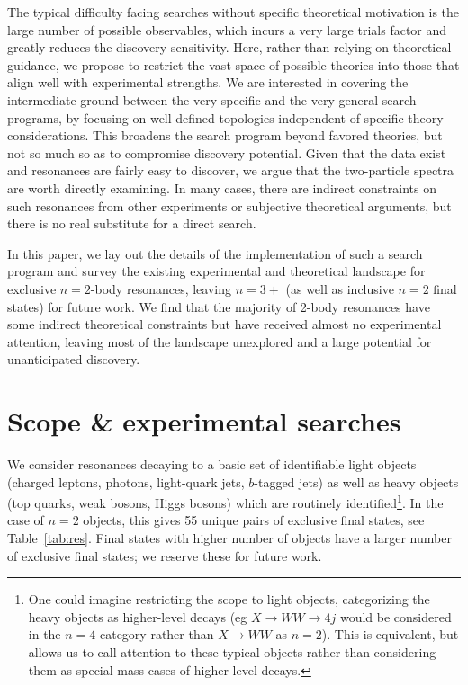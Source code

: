 The typical difficulty facing searches without specific theoretical motivation is the large number of possible observables, which incurs a very large trials factor and greatly reduces the discovery sensitivity.  Here, rather than relying on theoretical guidance, we propose to restrict the vast space of possible theories into those that align well with experimental strengths.    We are interested in covering the intermediate ground between the very specific and the very general search programs, by focusing on well-defined topologies independent of specific theory considerations. This broadens the search program beyond favored theories, but not so much so as to compromise discovery potential.  Given that the data exist and resonances are fairly easy to discover, we argue that the two-particle spectra are worth directly examining. In many cases, there are indirect constraints on such resonances from other experiments or subjective theoretical arguments, but there is no real substitute for a direct search.

In this paper, we lay out the details of the implementation of such a search program and survey the existing experimental and theoretical landscape for exclusive $n=2$-body resonances, leaving $n=3+$ (as well as inclusive $n=2$ final states) for future work.  We find that the majority of 2-body resonances have some indirect theoretical constraints but have received almost no experimental attention, leaving most of the landscape unexplored and a large potential for unanticipated discovery. 

\section{Scope \& experimental searches}

We consider resonances decaying to a basic set of identifiable light objects (charged leptons, photons, light-quark jets, $b$-tagged jets) as well as heavy objects (top quarks, weak bosons, Higgs bosons) which are routinely identified\footnote{One could imagine restricting the scope to light objects, categorizing the heavy objects as higher-level decays (eg $X\rightarrow WW\rightarrow 4j$ would be considered in the $n=4$ category rather than $X\rightarrow WW$ as $n=2$). This is equivalent, but allows us to call attention to these typical objects rather than considering them as special mass cases of higher-level decays.}. In the case of $n=2$ objects, this gives 55 unique pairs of exclusive final states, see Table~\ref{tab:res}.  Final states with higher number of objects have a larger number of exclusive final states; we reserve these for future work.


